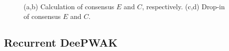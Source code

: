 \begin{figure}
     \begin{subfigure}[b]{0.5\textwidth}
        
         \caption{}
         \label{fig:}
     \end{subfigure}
     \hfill
     \begin{subfigure}[b]{\textwidth}
       
       \caption{}
       \label{fig:consenus}
     \end{subfigure}

  \vspace{1cm}
     
     \begin{subfigure}[b]{0.5\textwidth}
       
         \caption{}
         \label{fig:}
     \end{subfigure}
     \hfill
     \begin{subfigure}[b]{0.5\textwidth}
        
         \caption{}
         \label{fig:}
     \end{subfigure}

     \caption{(a,b) Calculation of consensus $E$ and $C$, respectively.
     (c,d) Drop-in of consensus $E$ and $C$.}
     \label{fig:}
\end{figure}

\subsection{Recurrent DeePWAK}
